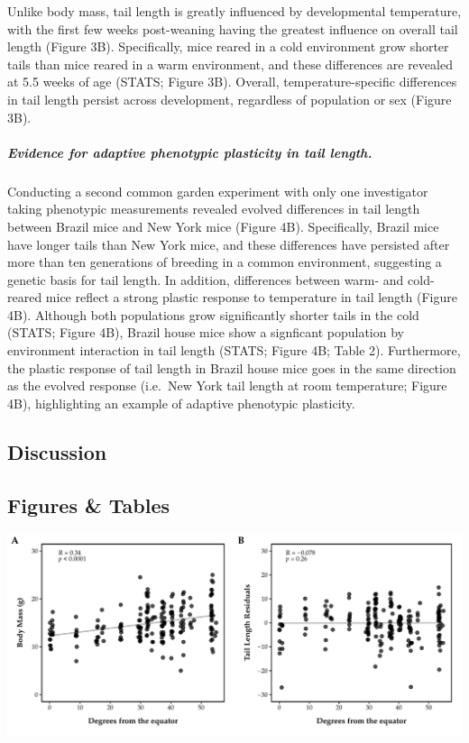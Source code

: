 \documentclass[]{article}
\let\oldsubparagraph\subparagraph
\renewcommand{\subparagraph}[1]{\oldsubparagraph{#1}\mbox{}}
\begin{document}
Unlike body mass, tail length is greatly influenced by developmental
temperature, with the first few weeks post-weaning having the greatest
influence on overall tail length (Figure 3B). Specifically, mice reared
in a cold environment grow shorter tails than mice reared in a warm
environment, and these differences are revealed at 5.5 weeks of age
(STATS; Figure 3B). Overall, temperature-specific differences in tail
length persist across development, regardless of population or sex
(Figure 3B).

\hypertarget{evidence-for-adaptive-phenotypic-plasticity-in-tail-length.}{%
\subparagraph{\texorpdfstring{\emph{Evidence for adaptive phenotypic
plasticity in tail
length.}}{Evidence for adaptive phenotypic plasticity in tail length.}}\label{evidence-for-adaptive-phenotypic-plasticity-in-tail-length.}}

Conducting a second common garden experiment with only one investigator
taking phenotypic measurements revealed evolved differences in tail
length between Brazil mice and New York mice (Figure 4B). Specifically,
Brazil mice have longer tails than New York mice, and these differences
have persisted after more than ten generations of breeding in a common
environment, suggesting a genetic basis for tail length. In addition,
differences between warm- and cold-reared mice reflect a strong plastic
response to temperature in tail length (Figure 4B). Although both
populations grow significantly shorter tails in the cold (STATS; Figure
4B), Brazil house mice show a signficant population by environment
interaction in tail length (STATS; Figure 4B; Table 2). Furthermore, the
plastic response of tail length in Brazil house mice goes in the same
direction as the evolved response (i.e.~New York tail length at room
temperature; Figure 4B), highlighting an example of adaptive phenotypic
plasticity.

\newpage

\hypertarget{discussion}{%
\subsection{Discussion}\label{discussion}}

\newpage

\hypertarget{figures-tables}{%
\subsection{Figures \& Tables}\label{figures-tables}}

\includegraphics{../figures/Nachman_transects.pdf}
\end{document}
